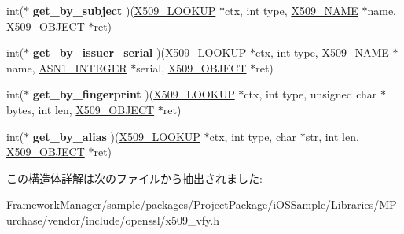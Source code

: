 \begin{DoxyCompactItemize}
\item 
\hypertarget{structx509__lookup__method__st_a2d6e3c3cc73f583d6d970abe12b65df2}{}int($\ast$ {\bfseries get\+\_\+by\+\_\+subject} )(\hyperlink{structx509__lookup__st}{X509\+\_\+\+L\+O\+O\+K\+U\+P} $\ast$ctx, int type, \hyperlink{struct_x509__name__st}{X509\+\_\+\+N\+A\+M\+E} $\ast$name, \hyperlink{structx509__object__st}{X509\+\_\+\+O\+B\+J\+E\+C\+T} $\ast$ret)\label{structx509__lookup__method__st_a2d6e3c3cc73f583d6d970abe12b65df2}

\item 
\hypertarget{structx509__lookup__method__st_af97ec1a34b72c8892d9b16e90e99b9f2}{}int($\ast$ {\bfseries get\+\_\+by\+\_\+issuer\+\_\+serial} )(\hyperlink{structx509__lookup__st}{X509\+\_\+\+L\+O\+O\+K\+U\+P} $\ast$ctx, int type, \hyperlink{struct_x509__name__st}{X509\+\_\+\+N\+A\+M\+E} $\ast$name, \hyperlink{structasn1__string__st}{A\+S\+N1\+\_\+\+I\+N\+T\+E\+G\+E\+R} $\ast$serial, \hyperlink{structx509__object__st}{X509\+\_\+\+O\+B\+J\+E\+C\+T} $\ast$ret)\label{structx509__lookup__method__st_af97ec1a34b72c8892d9b16e90e99b9f2}

\item 
\hypertarget{structx509__lookup__method__st_ae5331725f3feb7f560e670cc529b4475}{}int($\ast$ {\bfseries get\+\_\+by\+\_\+fingerprint} )(\hyperlink{structx509__lookup__st}{X509\+\_\+\+L\+O\+O\+K\+U\+P} $\ast$ctx, int type, unsigned char $\ast$bytes, int len, \hyperlink{structx509__object__st}{X509\+\_\+\+O\+B\+J\+E\+C\+T} $\ast$ret)\label{structx509__lookup__method__st_ae5331725f3feb7f560e670cc529b4475}

\item 
\hypertarget{structx509__lookup__method__st_a2db768d3cfbb0bfd076e5e8c17590d80}{}int($\ast$ {\bfseries get\+\_\+by\+\_\+alias} )(\hyperlink{structx509__lookup__st}{X509\+\_\+\+L\+O\+O\+K\+U\+P} $\ast$ctx, int type, char $\ast$str, int len, \hyperlink{structx509__object__st}{X509\+\_\+\+O\+B\+J\+E\+C\+T} $\ast$ret)\label{structx509__lookup__method__st_a2db768d3cfbb0bfd076e5e8c17590d80}

\end{DoxyCompactItemize}


この構造体詳解は次のファイルから抽出されました\+:\begin{DoxyCompactItemize}
\item 
Framework\+Manager/sample/packages/\+Project\+Package/i\+O\+S\+Sample/\+Libraries/\+M\+Purchase/vendor/include/openssl/x509\+\_\+vfy.\+h\end{DoxyCompactItemize}
